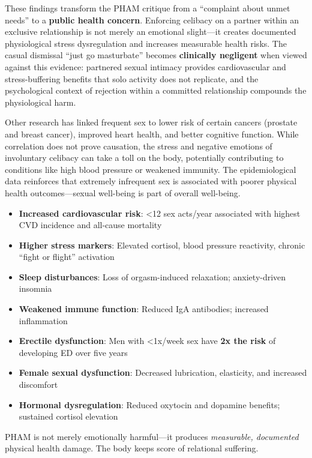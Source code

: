 \documentclass[12pt,openany]{book}
\numberwithin{equation}{chapter}
\begin{document}
These findings transform the PHAM critique from a ``complaint about unmet needs'' to a \textbf{public health concern}. Enforcing celibacy on a partner within an exclusive relationship is not merely an emotional slight---it creates documented physiological stress dysregulation and increases measurable health risks. The casual dismissal ``just go masturbate'' becomes \textbf{clinically negligent} when viewed against this evidence: partnered sexual intimacy provides cardiovascular and stress-buffering benefits that solo activity does not replicate, and the psychological context of rejection within a committed relationship compounds the physiological harm.

Other research has linked frequent sex to lower risk of certain cancers (prostate and breast cancer), improved heart health, and better cognitive function. While correlation does not prove causation, the stress and negative emotions of involuntary celibacy can take a toll on the body, potentially contributing to conditions like high blood pressure or weakened immunity. The epidemiological data reinforces that extremely infrequent sex is associated with poorer physical health outcomes---sexual well-being is part of overall well-being.

\begin{itemize}
    \item \textbf{Increased cardiovascular risk}: \textless12 sex acts/year associated with highest CVD incidence and all-cause mortality
    \item \textbf{Higher stress markers}: Elevated cortisol, blood pressure reactivity, chronic ``fight or flight'' activation
    \item \textbf{Sleep disturbances}: Loss of orgasm-induced relaxation; anxiety-driven insomnia
    \item \textbf{Weakened immune function}: Reduced IgA antibodies; increased inflammation
    \item \textbf{Erectile dysfunction}: Men with \textless1x/week sex have \textbf{2x the risk} of developing ED over five years
    \item \textbf{Female sexual dysfunction}: Decreased lubrication, elasticity, and increased discomfort
    \item \textbf{Hormonal dysregulation}: Reduced oxytocin and dopamine benefits; sustained cortisol elevation
\end{itemize}

PHAM is not merely emotionally harmful---it produces \textit{measurable, documented} physical health damage. The body keeps score of relational suffering.
\end{document}
